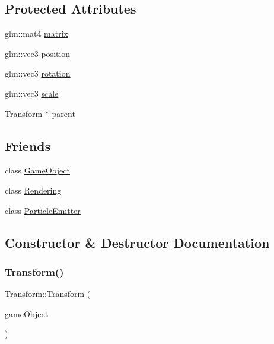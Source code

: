 \subsection*{Protected Attributes}
\begin{DoxyCompactItemize}
\item 
glm\+::mat4 \hyperlink{class_mason_1_1_transform_aeb64a62787375e23645da6f490763c25}{matrix}
\item 
glm\+::vec3 \hyperlink{class_mason_1_1_transform_ac9e11b4ec4433a38ac1100f12c955dcb}{position}
\item 
glm\+::vec3 \hyperlink{class_mason_1_1_transform_ae2f541ade79d561584619e93edb034ae}{rotation}
\item 
glm\+::vec3 \hyperlink{class_mason_1_1_transform_a4618b31e34a6ec8a0ee638401fc56367}{scale}
\item 
\hyperlink{class_mason_1_1_transform}{Transform} $\ast$ \hyperlink{class_mason_1_1_transform_a1e2c91adcef43bcc170803656260f9db}{parent}
\end{DoxyCompactItemize}
\subsection*{Friends}
\begin{DoxyCompactItemize}
\item 
class \hyperlink{class_mason_1_1_transform_a00df87c957d8f7ee0fc51f07a0542f4a}{Game\+Object}
\item 
class \hyperlink{class_mason_1_1_transform_a33061a25b8332281d02c83e2bf1d4959}{Rendering}
\item 
class \hyperlink{class_mason_1_1_transform_a82b374d797a09668286ac5cf26f539f3}{Particle\+Emitter}
\end{DoxyCompactItemize}


\subsection{Constructor \& Destructor Documentation}
\hypertarget{class_mason_1_1_transform_a00209266b27fa0c297551a0ce4a07017}{}\label{class_mason_1_1_transform_a00209266b27fa0c297551a0ce4a07017} 
\subsubsection{\texorpdfstring{Transform()}{Transform()}}
{\footnotesize\ttfamily Transform\+::\+Transform (\begin{DoxyParamCaption}\item[{\hyperlink{class_mason_1_1_game_object}{Game\+Object} $\ast$}]{game\+Object }\end{DoxyParamCaption})\hspace{0.3cm}{\ttfamily [protected]}}



